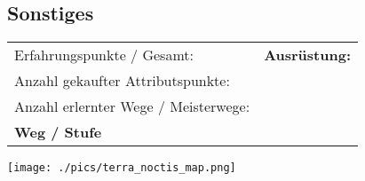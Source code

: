 \documentclass{article}
\begin{document}
\newline\hline
\begin{center}
\subsection{Sonstiges}
\end{center}
\begin{tabular}{ m{10cm} m{10cm}}
Erfahrungspunkte / Gesamt:&\textbf{Ausrüstung:}\\
Anzahl gekaufter Attributspunkte:&\\
Anzahl erlernter Wege / Meisterwege:&\\
\textbf{Weg / Stufe}&\\
\end{tabular}
\texttt{[image: ./pics/terra\_noctis\_map.png]}
\end{document}
